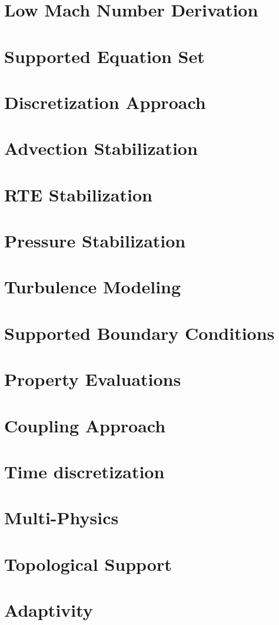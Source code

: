 \documentclass[12pt]{report}
\begin{document}
\section{Low Mach Number Derivation}


\section{Supported Equation Set}


\section{Discretization Approach}


\section{Advection Stabilization}


\section{RTE Stabilization}


\section{Pressure Stabilization}


\section{Turbulence Modeling}


\section{Supported Boundary Conditions}


\section{Property Evaluations}


\section{Coupling Approach}


\section{Time discretization}


\section{Multi-Physics}


\section{Topological Support}


\section{Adaptivity}




\end{document}
